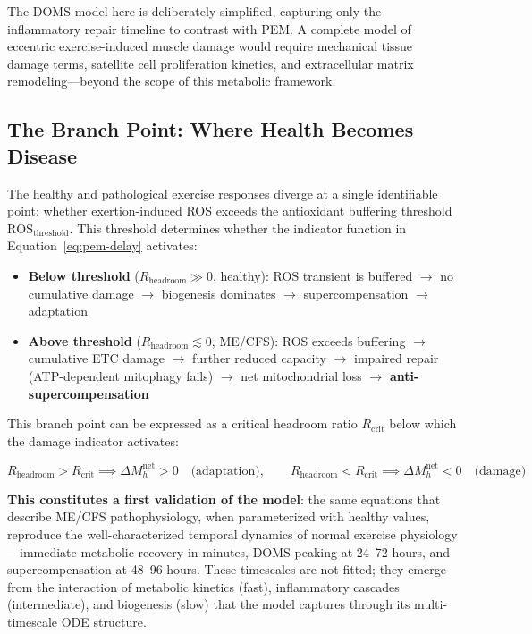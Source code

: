\begin{limitation}
The DOMS model here is deliberately simplified, capturing only the inflammatory repair timeline to contrast with PEM. A complete model of eccentric exercise-induced muscle damage would require mechanical tissue damage terms, satellite cell proliferation kinetics, and extracellular matrix remodeling---beyond the scope of this metabolic framework.
\end{limitation}

\subsection{The Branch Point: Where Health Becomes Disease}
\label{sec:branch-point}

The healthy and pathological exercise responses diverge at a single identifiable point: whether exertion-induced ROS exceeds the antioxidant buffering threshold $\text{ROS}_{\text{threshold}}$. This threshold determines whether the indicator function in Equation~\ref{eq:pem-delay} activates:

\begin{itemize}
    \item \textbf{Below threshold} ($R_{\text{headroom}} \gg 0$, healthy): ROS transient is buffered $\to$ no cumulative damage $\to$ biogenesis dominates $\to$ supercompensation $\to$ adaptation
    \item \textbf{Above threshold} ($R_{\text{headroom}} \lesssim 0$, ME/CFS): ROS exceeds buffering $\to$ cumulative ETC damage $\to$ further reduced capacity $\to$ impaired repair (ATP-dependent mitophagy fails) $\to$ net mitochondrial loss $\to$ \textbf{anti-supercompensation}
\end{itemize}

This branch point can be expressed as a critical headroom ratio $R_{\text{crit}}$ below which the damage indicator activates:

\begin{equation}
\label{eq:branch-point}
R_{\text{headroom}} > R_{\text{crit}} \implies \Delta M_h^{\text{net}} > 0 \quad \text{(adaptation)}, \qquad R_{\text{headroom}} < R_{\text{crit}} \implies \Delta M_h^{\text{net}} < 0 \quad \text{(damage)}
\end{equation}

\textbf{This constitutes a first validation of the model}: the same equations that describe ME/CFS pathophysiology, when parameterized with healthy values, reproduce the well-characterized temporal dynamics of normal exercise physiology---immediate metabolic recovery in minutes, DOMS peaking at 24--72 hours, and supercompensation at 48--96 hours. These timescales are not fitted; they emerge from the interaction of metabolic kinetics (fast), inflammatory cascades (intermediate), and biogenesis (slow) that the model captures through its multi-timescale ODE structure.

